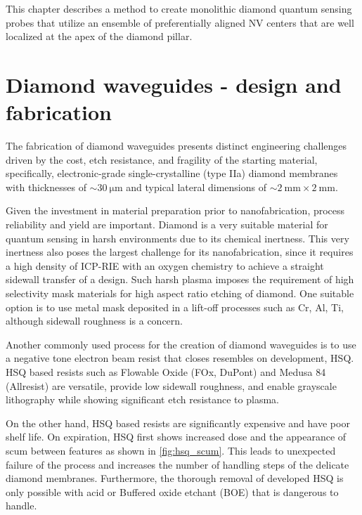 This chapter describes a method to create monolithic diamond quantum sensing probes that utilize an ensemble of preferentially aligned \gls{NV} centers that are well localized at the apex of the diamond pillar.

\section{Diamond waveguides - design and fabrication}

The fabrication of diamond waveguides presents distinct engineering challenges driven by the cost, etch resistance, and fragility of the starting material, specifically, electronic-grade single-crystalline (type IIa) diamond membranes with thicknesses of $\sim\qty{30}{\micro\meter}$ and typical lateral dimensions of $\sim\qty{2}{\milli\meter}\times\qty{2}{\milli\meter}$\cite{torosReactiveIonEtching2020}. 

Given the investment in material preparation prior to nanofabrication, process reliability and yield are important. Diamond is a very suitable material for quantum sensing in harsh environments due to its chemical inertness. This very inertness also poses the largest challenge for its nanofabrication, since it requires a high density of \gls{ICP}-\gls{RIE} with an oxygen chemistry to achieve a straight sidewall transfer of a design. Such harsh plasma imposes the requirement of high selectivity mask materials for high aspect ratio etching of diamond. One suitable option is to use metal mask deposited in a lift-off processes such as Cr, Al, Ti\cite{torosReactiveIonEtching2020}, although sidewall roughness is a concern.

Another commonly used process for the creation of diamond waveguides is to use a negative tone electron beam resist that closes resembles  on development, \gls{HSQ}. \gls{HSQ} based resists such as Flowable Oxide (FOx, DuPont) and Medusa 84  (Allresist) are versatile, provide low sidewall roughness, and enable grayscale lithography\cite{khoninaGrayscaleLithographyBrief2024,opaluchMedusa84SiH2025} while showing significant etch resistance to  plasma. 

On the other hand, \gls{HSQ} based resists are significantly expensive and have poor shelf life. On expiration, \gls{HSQ} first shows increased dose and the appearance of scum between features\cite{yangUnderstandingHydrogenSilsesquioxane2009,rooksHSQStorage} as shown in \cref{fig:hsq_scum}. This leads to unexpected failure of the process and increases the number of handling steps of the delicate diamond membranes. Furthermore, the thorough removal of developed \gls{HSQ} is only possible with  acid or Buffered oxide etchant (\gls{BOE}) that is dangerous to handle.

